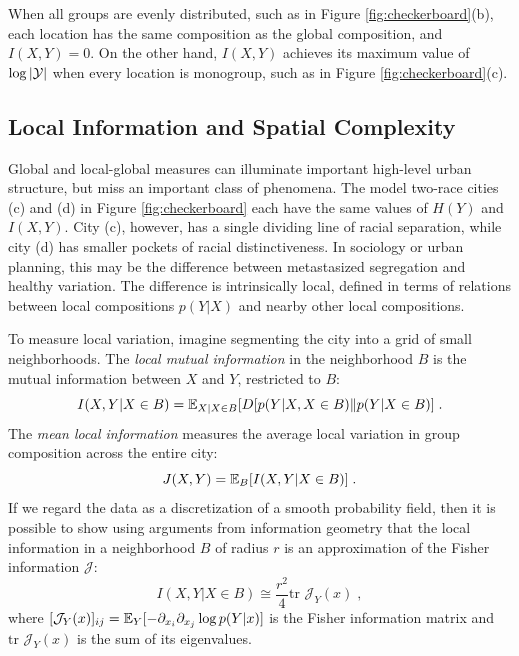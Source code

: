 \documentclass[9pt,twocolumn,twoside]{pnas-new}
\begin{document}
	When all groups are evenly distributed, such as in Figure \ref{fig:checkerboard}(b), each location has the same composition as the global composition, and $I(X,Y) = 0$. 
	On the other hand, $I(X,Y)$ achieves its maximum value of $\log \left|\mathcal{Y}\right|$ when every location is monogroup, such as in Figure \ref{fig:checkerboard}(c). 

\subsection*{Local Information and Spatial Complexity}
	
	Global and local-global measures can illuminate important high-level urban structure, but miss an important class of phenomena. 
	The model two-race cities (c) and (d) in Figure \ref{fig:checkerboard} each have the same values of $H(Y)$ and $I(X,Y)$. 
	City (c), however, has a single dividing line of racial separation, while city (d) has smaller pockets of racial distinctiveness. 
	In sociology or urban planning, this may be the difference between metastasized segregation and healthy variation. 
	The difference is intrinsically local, defined in terms of relations between local compositions $p(Y|X)$ and nearby other local compositions. 

	To measure local variation, imagine segmenting the city into a grid of small neighborhoods. 
	The \emph{local mutual information} in the neighborhood $B$ is the mutual information between $X$ and $Y$, restricted to $B$:
	\begin{equation*}
		I(X,Y | X \in B) = \mathbb{E}_{X|X \in B}[D[p(Y|X,X\in B)\|p(Y|X\in B)]\;.
	\end{equation*}
	The \emph{mean local information} measures the average local variation in group composition across the entire city:  
	\begin{equation}
		J(X,Y) = \mathbb{E}_B[I(X,Y|X \in B)]\;.
	\end{equation}
	If we regard the data as a discretization of a smooth probability field, then it is possible to show using arguments from information geometry \cite{Amari2000} that the local information in a neighborhood $B$ of radius $r$ is an approximation of the Fisher information $\mathcal{J}$:
	\begin{equation}
		I(X,Y|X \in B) \cong \frac{r^2}{4} \text{tr } \mathcal{J}_Y(x)\;, \label{eq:fisher_approx}
	\end{equation}
	where $[\mathcal{J}_Y(x)]_{ij} = \mathbb{E}_Y[-\partial_{x_i} \partial_{x_j} \log p(Y|x)]$ is the Fisher information matrix and $\text{tr } \mathcal{J}_Y(x)$ is the sum of its eigenvalues. 
\end{document}
